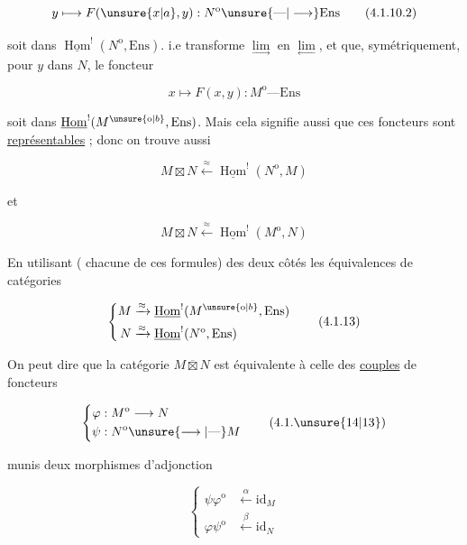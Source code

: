 \[
y\longmapsto F(\unsure{x|a},y):N^{\mathrm{o}}\unsure{\text{---}|\longrightarrow}\mathrm{Ens}
\tag*{(4.1.10.2)}
\]

 soit dans $\underline{\operatorname{Hom}}^{!}(N^{\mathrm{o}},\mathrm{Ens})$. i.e transforme  $\underset{\longrightarrow}{\lim}$ en $\underset{\longleftarrow}{\lim}$, et que, symétriquement, pour  $y$ dans $N$, le foncteur

\[
x\longmapsto F(x,y):M^{\mathrm{o}}\text{---}\mathrm{Ens}
\tag*{(4.1.10.3)}
\]

soit dans $\underline{\operatorname{Hom}}^{!}(M^{\unsure{\mathrm{o}|b}},\mathrm{Ens})$. Mais cela signifie aussi que ces foncteurs sont \uline{représentables} ; donc on trouve aussi

\[
M\boxtimes N\xleftarrow{\approx}\underline{\operatorname{Hom}}^{!}(N^{\mathrm{o}},M)
\tag*{(4.1.11)}
\]

et

\[
M\boxtimes N\xleftarrow{\approx}\underline{\operatorname{Hom}}^{!}(M^{\mathrm{o}},N)
\tag*{(4.1.12)}
\]

En utilisant ( chacune de ces formules) des deux côtés les équivalences de catégories

\[
\left\{\begin{aligned}
M&\xrightarrow{\approx}\underline{\operatorname{Hom}}^{!}(M^{\unsure{\mathrm{o}|b}},\mathrm{Ens})\\
N&\xrightarrow{\approx}\underline{\operatorname{Hom}}^{!}(N^{\mathrm{o}},\mathrm{Ens})
\end{aligned}\right.
\tag*{(4.1.13)}
\]

On peut dire  que la catégorie $M\overline{\boxtimes}N$ est équivalente à celle des \uline{couples} de foncteurs

\[
\left\{\begin{aligned}
\varphi &: M^{\mathrm{o}}\longrightarrow N\\
\psi &: N^{\mathrm{o}}\unsure{\longrightarrow|\text{---}}M
\end{aligned}\right.
\tag*{(4.1.\unsure{14|13})}
\]

   munis  deux morphismes d'adjonction

\[
\left\{\begin{aligned}
\psi\varphi^{\mathrm{o}}&\xleftarrow{\alpha}\mathrm{id}_{M}\\
\varphi\psi^{\mathrm{o}}&\xleftarrow{\beta}\mathrm{id}_{N}
\end{aligned}\right.
\tag*{(4.1.15)}
\]

